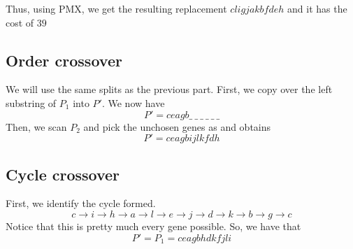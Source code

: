 Thus, using PMX, we get the resulting replacement \(cligjakbfdeh\) and it has the cost of \(39\)

\subsection{Order crossover}

We will use the same splits as the previous part. First, we copy over the left substring of \(P_1\) into \(P'\). We now have
\[
    P' = ceagb\_\ \_\ \_\ \_\ \_\ \_
\]
Then, we scan \(P_2\) and pick the unchosen genes as and obtains
\[
    P' = ceagb ijlkfdh
\]

\subsection{Cycle crossover}

First, we identify the cycle formed.
\[
    c \to i \to h \to a \to l \to e \to j \to d \to k \to b \to g \to c
\]
Notice that this is pretty much every gene possible. So, we have that
\[
    P' = P_1 = ceagbhdkfjli
\]
